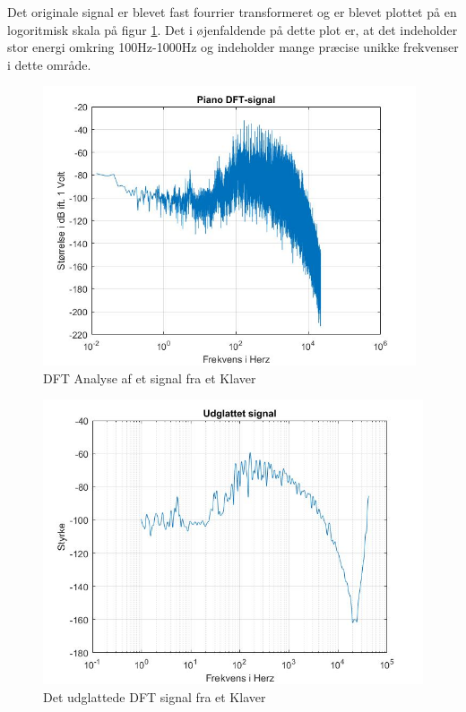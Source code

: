 Det originale signal er blevet fast fourrier transformeret og er blevet plottet på en logoritmisk skala på figur \ref{fig:Klaver DFT}. Det i øjenfaldende på dette plot er, at det indeholder stor energi omkring 100Hz-1000Hz og indeholder mange præcise unikke frekvenser i dette område. 
\begin{figure}[H]
	\centering
	\includegraphics[width=110mm]{figures/Piano/DFT.jpg}
	\caption{DFT Analyse af et signal fra et Klaver}
	\label{fig:Klaver DFT}
\end{figure}

\begin{figure}[H]
	\centering
	\includegraphics[width=120mm]{figures/Piano/udglattet.jpg}
	\caption{Det udglattede DFT signal fra et Klaver}
	\label{fig:Klaver udglattet}
\end{figure}
\newpage

